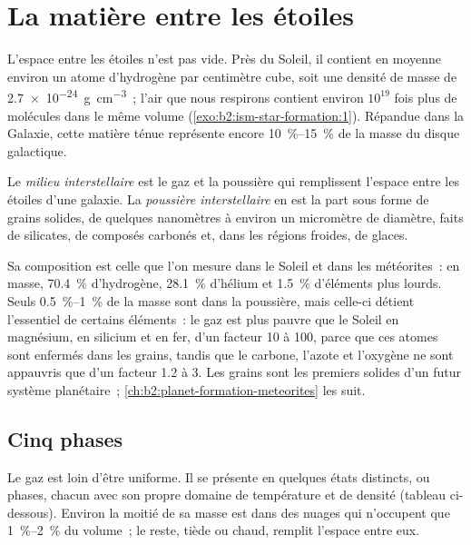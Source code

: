 \section{La matière entre les étoiles}

L'espace entre les étoiles n'est pas vide. Près du Soleil, il contient en moyenne environ
un atome d'hydrogène par centimètre cube, soit une densité de masse de \qty{2.7e-24}{g.cm^{-3}}~; l'air que nous respirons contient environ $10^{19}$ fois
plus de molécules dans le même volume (\cref{exo:b2:ism-star-formation:1}). Répandue dans la Galaxie, cette matière ténue représente encore \qtyrange{10}{15}{\percent} de la masse
du
disque
galactique.

\begin{definition}
\label{def:b2:ism-star-formation:ism}
Le \emph{milieu interstellaire} est le gaz et la poussière qui
remplissent l'espace entre les étoiles d'une galaxie. La \emph{poussière interstellaire} en est la part sous forme de grains solides, de quelques
nanomètres à environ un micromètre de diamètre, faits de silicates, de composés carbonés et, dans les régions froides,
de
glaces.
\end{definition}

Sa composition est celle que l'on mesure dans le Soleil et dans les météorites~: en
masse, \qty{70.4}{\percent} d'hydrogène, \qty{28.1}{\percent} d'hélium et \qty{1.5}{\percent} d'éléments plus lourds. Seuls \qtyrange{0.5}{1}{\percent} de la
masse sont dans la poussière, mais celle-ci détient l'essentiel de certains éléments~: le gaz est plus pauvre que le Soleil en magnésium, en silicium et en fer, d'un facteur 10 à 100, parce que ces atomes sont enfermés dans les grains, tandis que
le carbone, l'azote et l'oxygène ne sont appauvris que d'un facteur 1.2 à 3. Les grains sont les premiers solides d'un futur
système
planétaire~;
\cref{ch:b2:planet-formation-meteorites}
les
suit.

\subsection{Cinq phases}

Le gaz est loin d'être uniforme. Il se présente en quelques états distincts, ou phases,
chacun avec son propre domaine de température et de densité (tableau ci-dessous). Environ la moitié de sa masse est dans des nuages qui n'occupent que \qtyrange{1}{2}{\percent}
du volume~; le reste, tiède ou chaud, remplit l'espace entre
eux.

